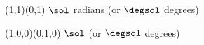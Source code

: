 \TWOVECTORSANGLE(1,1)(0,1){\sol}
$\sol$ radians
\RADtoDEG{\sol}{\degsol}
(or $\degsol$ degrees)

\TWOVECTORSANGLE(1,0,0)(0,1,0){\sol}
$\sol$
\RADtoDEG{\sol}{\degsol}
(or $\degsol$ degrees)
